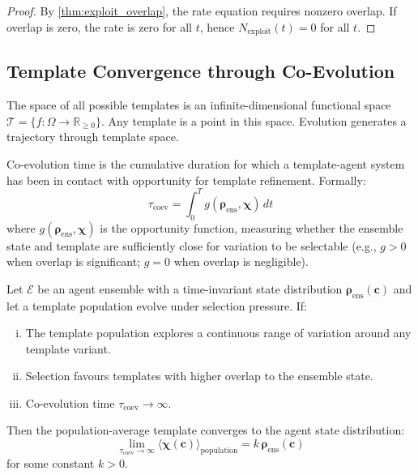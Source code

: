 \documentclass[11pt,twocolumn,a4paper]{article}
\newcommand{\R}{\mathbb{R}}
\newcommand{\Template}{\boldsymbol{\chi}}
\newcommand{\State}{\boldsymbol{\rho}}
\begin{document}
\begin{proof}
By \cref{thm:exploit_overlap}, the rate equation requires nonzero overlap. If overlap is zero, the rate is zero for all $t$, hence $N_{\mathrm{exploit}}(t) = 0$ for all $t$.
\end{proof}

\subsection{Template Convergence through Co-Evolution}

\begin{definition}
The space of all possible templates is an infinite-dimensional functional space $\mathcal{T} = \{f : \Omega \to \R_{\ge 0}\}$. Any template is a point in this space. Evolution generates a trajectory through template space.
\end{definition}

\begin{definition}
Co-evolution time is the cumulative duration for which a template-agent system has been in contact with opportunity for template refinement. Formally:
\begin{equation}
\tau_{\mathrm{coev}} = \int_0^T g(\State_{\mathrm{ens}}, \Template) \, dt
\label{eq:coev_time}
\end{equation}
where $g(\State_{\mathrm{ens}}, \Template)$ is the opportunity function, measuring whether the ensemble state and template are sufficiently close for variation to be selectable (e.g., $g > 0$ when overlap is significant; $g = 0$ when overlap is negligible).
\end{definition}

\begin{theorem}
\label{thm:template_convergence}
Let $\mathcal{E}$ be an agent ensemble with a time-invariant state distribution $\State_{\mathrm{ens}}(\mathbf{c})$ and let a template population evolve under selection pressure. If:
\begin{enumerate}[(i)]
\item The template population explores a continuous range of variation around any template variant.
\item Selection favours templates with higher overlap to the ensemble state.
\item Co-evolution time $\tau_{\mathrm{coev}} \to \infty$.
\end{enumerate}
Then the population-average template converges to the agent state distribution:
\begin{equation}
\lim_{\tau_{\mathrm{coev}} \to \infty} \langle \Template(\mathbf{c}) \rangle_{\mathrm{population}} = k \, \State_{\mathrm{ens}}(\mathbf{c})
\label{eq:convergence}
\end{equation}
for some constant $k > 0$.
\end{theorem}
\end{document}
